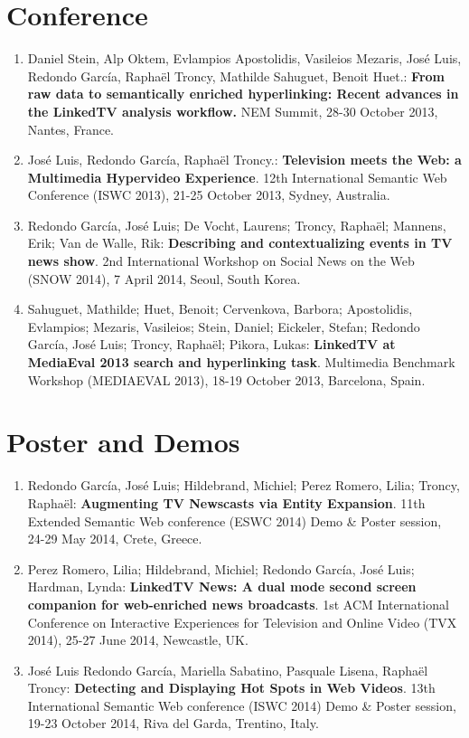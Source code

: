 \documentclass[a4paper,11pt]{report}
\begin{document}
\section*{Conference}
\begin{enumerate}
\item Daniel Stein, Alp Oktem, Evlampios Apostolidis, Vasileios Mezaris, Jos\'e Luis, Redondo Garc\'ia, Rapha\"el Troncy, Mathilde Sahuguet, Benoit Huet.:
\textbf{From raw data to semantically enriched hyperlinking: Recent advances in the LinkedTV analysis workflow.}
NEM Summit, 28-30 October 2013, Nantes, France.

\item Jos\'e Luis, Redondo Garc\'ia, Rapha\"el Troncy.:
\textbf{Television meets the Web: a Multimedia Hypervideo Experience}.
12th International Semantic Web Conference (ISWC 2013), 21-25 October 2013, Sydney, Australia.

\item Redondo Garc\'ia, Jos\'e Luis; De Vocht, Laurens; Troncy, Rapha\"el; Mannens, Erik; Van de Walle, Rik:
\textbf{Describing and contextualizing events in TV news show}.
2nd International Workshop on Social News on the Web (SNOW 2014), 7 April 2014, Seoul, South Korea.

\item Sahuguet, Mathilde; Huet, Benoit; Cervenkova, Barbora; Apostolidis, Evlampios; Mezaris, Vasileios; Stein, Daniel; Eickeler, Stefan; Redondo Garc\'ia, Jos\'e Luis; Troncy, Rapha\"el; Pikora, Lukas:
\textbf{LinkedTV at MediaEval 2013 search and hyperlinking task}.
Multimedia Benchmark Workshop (MEDIAEVAL 2013), 18-19 October 2013, Barcelona, Spain.
\end{enumerate}

\section*{Poster and Demos}
\begin{enumerate}
\item Redondo Garc\'ia, Jos\'e Luis; Hildebrand, Michiel; Perez Romero, Lilia; Troncy, Rapha\"el:
\textbf{Augmenting TV Newscasts via Entity Expansion}.
11th Extended Semantic Web conference (ESWC 2014) Demo \& Poster session, 24-29 May 2014, Crete, Greece.

\item Perez Romero, Lilia; Hildebrand, Michiel; Redondo Garc\'ia, Jos\'e Luis; Hardman, Lynda:
\textbf{LinkedTV News: A dual mode second screen companion for web-enriched news broadcasts}.
1st ACM International Conference on Interactive Experiences for Television and Online Video (TVX 2014), 25-27 June 2014, Newcastle, UK.

\item Jos\'e Luis Redondo Garc\'ia, Mariella Sabatino, Pasquale Lisena, Rapha\"el Troncy:
\textbf{Detecting and Displaying Hot Spots in Web Videos}.
13th International Semantic Web conference (ISWC 2014) Demo \& Poster session, 19-23 October 2014, Riva del Garda, Trentino, Italy.
\end{enumerate}
\end{document}
